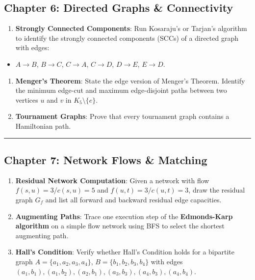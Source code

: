 \documentclass[
]{book}
\providecommand{\tightlist}{%
  \setlength{\itemsep}{0pt}\setlength{\parskip}{0pt}}
\theoremstyle{definition}
\theoremstyle{definition}
\theoremstyle{definition}
\theoremstyle{definition}
\theoremstyle{remark}
\begin{document}
\subsection{Chapter 6: Directed Graphs \& Connectivity}\label{chapter-6-directed-graphs-connectivity}

\begin{enumerate}
\def\labelenumi{\arabic{enumi}.}
\tightlist
\item
  \textbf{Strongly Connected Components}: Run Kosaraju's or Tarjan's algorithm to identify the strongly connected components (SCCs) of a directed graph with edges:
\end{enumerate}

\begin{itemize}
\tightlist
\item
  \(A \to B\), \(B \to C\), \(C \to A\), \(C \to D\), \(D \to E\), \(E \to D\).
\end{itemize}

\begin{enumerate}
\def\labelenumi{\arabic{enumi}.}
\setcounter{enumi}{1}
\tightlist
\item
  \textbf{Menger's Theorem}: State the edge version of Menger's Theorem. Identify the minimum edge-cut and maximum edge-disjoint paths between two vertices \(u\) and \(v\) in \(K_5 \setminus \{e\}\).
\item
  \textbf{Tournament Graphs}: Prove that every tournament graph contains a Hamiltonian path.
\end{enumerate}

\begin{center}\rule{0.5\linewidth}{0.5pt}\end{center}

\subsection{Chapter 7: Network Flows \& Matching}\label{chapter-7-network-flows-matching-1}

\begin{enumerate}
\def\labelenumi{\arabic{enumi}.}
\tightlist
\item
  \textbf{Residual Network Computation}: Given a network with flow \(f(s, u) = 3 / c(s, u) = 5\) and \(f(u, t) = 3 / c(u, t) = 3\), draw the residual graph \(G_f\) and list all forward and backward residual edge capacities.
\item
  \textbf{Augmenting Paths}: Trace one execution step of the \textbf{Edmonds-Karp algorithm} on a simple flow network using BFS to select the shortest augmenting path.
\item
  \textbf{Hall's Condition}: Verify whether Hall's Condition holds for a bipartite graph \(A = \{a_1, a_2, a_3, a_4\}\), \(B = \{b_1, b_2, b_3, b_4\}\) with edges \((a_1, b_1), (a_1, b_2), (a_2, b_1), (a_3, b_3), (a_4, b_3), (a_4, b_4)\).
\end{enumerate}
\end{document}
